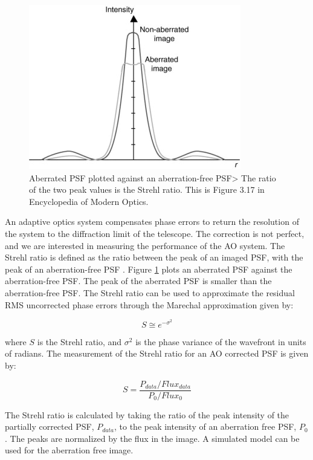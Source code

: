\begin{figure}
    \centering
    \includegraphics{Chapter Materials/Chapter One Materials/StrehlRatio.png}
    \caption{Aberrated PSF plotted against an aberration-free PSF> The ratio of the two peak values is the Strehl ratio. This is Figure 3.17 in Encyclopedia of Modern Optics.}
    \label{fig:SR}
\end{figure}

An adaptive optics system compensates phase errors to return the resolution of the system to the diffraction limit of the telescope. The correction is not perfect, and we are interested in measuring the performance of the AO system. The Strehl ratio is defined as the ratio between the peak of an imaged PSF, with the peak of an aberration-free PSF \citep{reine2005encyclopedia}. Figure \ref{fig:SR} plots an aberrated PSF against the aberration-free PSF. The peak of the aberrated PSF is smaller than the aberration-free PSF. The Strehl ratio can be used to approximate the residual RMS uncorrected phase errors through the Marechal approximation given by:

\begin{equation}
    S \cong e^{-\sigma^2}
\end{equation}

\noindent where $S$ is the Strehl ratio, and $\sigma^2$ is the phase variance of the wavefront in units of radians. The measurement of the Strehl ratio for an AO corrected PSF is given by:

\begin{equation}
    S=\frac{P_{data}/Flux_{data}}{P_{0}/Flux_{0}}
    \label{Strehl}
\end{equation}


\noindent The Strehl ratio is calculated by taking the ratio of the peak intensity of the partially corrected PSF, $P_{data}$,  to the peak intensity of an aberration free PSF, $P_0$. The peaks are normalized by the flux in the image. A simulated model can be used for the aberration free image. 

